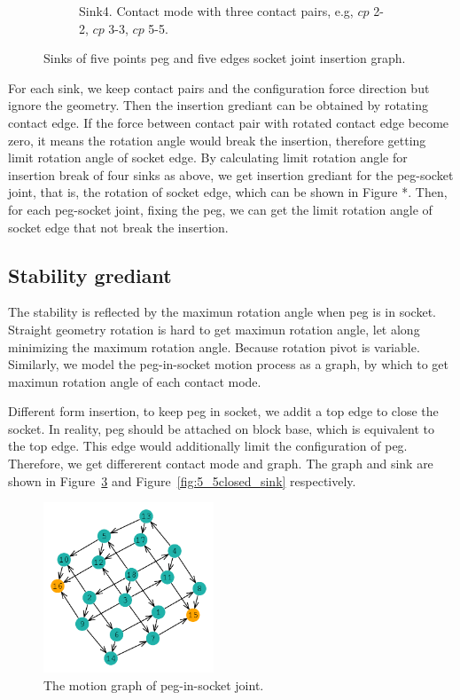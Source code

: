 \begin{figure}
\begin{center}
\begin{subfigure}[t]{0.24\textwidth}
\begin{center}
\end{center}
\label{fig:5_5_sink4}
\caption{Sink4. Contact mode with three contact pairs, e.g, ${cp}$ 2-2, ${cp}$ 3-3, ${cp}$ 5-5. }
\end{subfigure}
\end{center}
\label{fig:5_5_sink}
\caption{Sinks of five points peg and five edges socket joint insertion graph. }
\end{figure}

For each sink, we keep contact pairs and the configuration force direction but ignore the geometry. Then the insertion grediant can be obtained by rotating contact edge. If the force between contact pair with rotated contact edge become zero, it means the rotation angle would break the insertion, therefore getting limit rotation angle of socket edge. By calculating limit rotation angle for insertion break of four sinks as above, we get insertion grediant for the peg-socket joint, that is, the rotation of socket edge, which can be shown in Figure *. Then, for each peg-socket joint, fixing the peg, we can get the limit rotation angle of socket edge that not break the insertion.



\subsection{Stability grediant}

The stability is reflected by the maximun rotation angle when peg is in socket. Straight geometry rotation is hard to get maximun rotation angle, let along minimizing the maximum rotation angle. Because rotation pivot is variable. Similarly, we model the peg-in-socket motion process as a graph, by which to get maximun rotation angle of each contact mode.

Different form insertion, to keep peg in socket, we addit a top edge to close the socket. In reality, peg should be attached on block base, which is equivalent to the top edge. This edge would additionally limit the configuration of peg. Therefore, we get differerent contact mode and graph. 
The graph and sink are shown in Figure~\ref{fig:stability_graph} and Figure~\ref{fig:5_5closed_sink} respectively.

\begin{figure}
\begin{center}
\includegraphics[width=2in]{figures/stability_graph.png}
\end{center}
\caption{The motion graph of peg-in-socket joint. }
\label{fig:stability_graph}
\end{figure}

